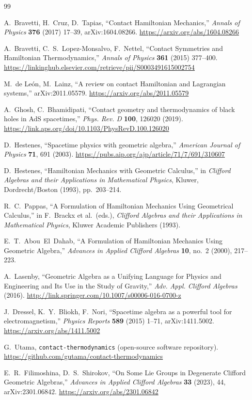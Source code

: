 \documentclass[11pt]{article}
\begin{document}

\begin{thebibliography}{99}

A.~Bravetti, H.~Cruz, D.~Tapias, ``Contact Hamiltonian Mechanics,'' \textit{Annals of Physics} \textbf{376} (2017) 17--39, arXiv:1604.08266. \url{https://arxiv.org/abs/1604.08266}

A.~Bravetti, C.~S.~Lopez-Monsalvo, F.~Nettel, ``Contact Symmetries and Hamiltonian Thermodynamics,'' \textit{Annals of Physics} \textbf{361} (2015) 377--400. \url{https://linkinghub.elsevier.com/retrieve/pii/S0003491615002754}

M.~de Le\'on, M.~Lainz, ``A review on contact Hamiltonian and Lagrangian systems,'' arXiv:2011.05579. \url{https://arxiv.org/abs/2011.05579}

A.~Ghosh, C.~Bhamidipati, ``Contact geometry and thermodynamics of black holes in AdS spacetimes,'' \textit{Phys. Rev. D} \textbf{100}, 126020 (2019). \url{https://link.aps.org/doi/10.1103/PhysRevD.100.126020}

D.~Hestenes, ``Spacetime physics with geometric algebra,'' \textit{American Journal of Physics} \textbf{71}, 691 (2003). \url{https://pubs.aip.org/ajp/article/71/7/691/310607}

D.~Hestenes, ``Hamiltonian Mechanics with Geometric Calculus,'' in \textit{Clifford Algebras and their Applications in Mathematical Physics}, Kluwer, Dordrecht/Boston (1993), pp.~203--214.

R.~C.~Pappas, ``A Formulation of Hamiltonian Mechanics Using Geometrical Calculus,'' in F.~Brackx et al.\ (eds.), \textit{Clifford Algebras and their Applications in Mathematical Physics}, Kluwer Academic Publishers (1993).

E.~T.~Abou~El~Dahab, ``A Formulation of Hamiltonian Mechanics Using Geometric Algebra,'' \textit{Advances in Applied Clifford Algebras} \textbf{10}, no.~2 (2000), 217--223.

A.~Lasenby, ``Geometric Algebra as a Unifying Language for Physics and Engineering and Its Use in the Study of Gravity,'' \textit{Adv. Appl. Clifford Algebras} (2016). \url{http://link.springer.com/10.1007/s00006-016-0700-z}

J.~Dressel, K.~Y.~Bliokh, F.~Nori, ``Spacetime algebra as a powerful tool for electromagnetism,'' \textit{Physics Reports} \textbf{589} (2015) 1--71, arXiv:1411.5002. \url{https://arxiv.org/abs/1411.5002}

G.~Utama, \texttt{contact-thermodynamics} (open-source software repository). \url{https://github.com/gutama/contact-thermodynamics}

E.~R.~Filimoshina, D.~S.~Shirokov, ``On Some Lie Groups in Degenerate Clifford Geometric Algebras,'' \textit{Advances in Applied Clifford Algebras} \textbf{33} (2023), 44, arXiv:2301.06842. \url{https://arxiv.org/abs/2301.06842}

\end{thebibliography}
\end{document}
